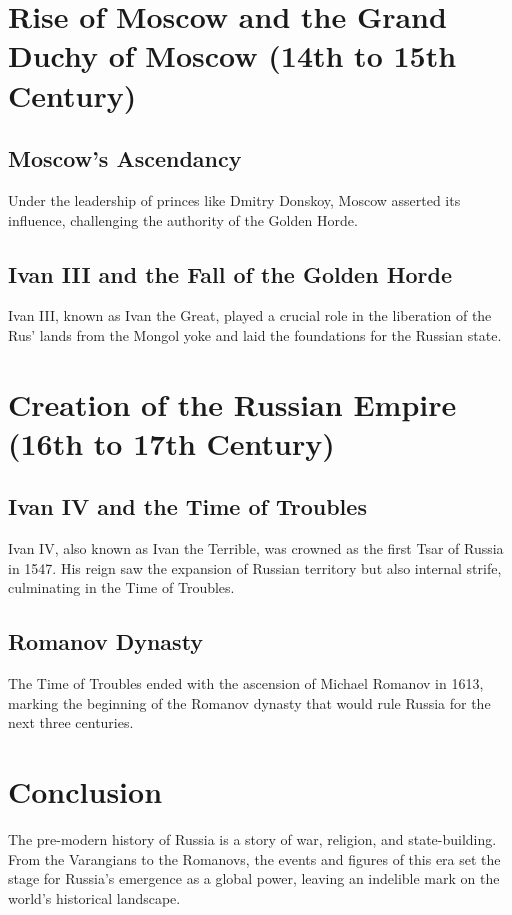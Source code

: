 \documentclass[a4paper,12pt]{book}
\begin{document}
\section{Rise of Moscow and the Grand Duchy of Moscow (14th to 15th Century)}
\label{sec:rise-of-moscow}
\subsection{Moscow’s Ascendancy}
Under the leadership of princes like Dmitry Donskoy, Moscow asserted its influence, challenging the authority of the Golden Horde.

\subsection{Ivan III and the Fall of the Golden Horde}
Ivan III, known as Ivan the Great, played a crucial role in the liberation of the Rus’ lands from the Mongol yoke and laid the foundations for the Russian state.

\section{Creation of the Russian Empire (16th to 17th Century)}
\label{sec:russian-empire}
\subsection{Ivan IV and the Time of Troubles}
Ivan IV, also known as Ivan the Terrible, was crowned as the first Tsar of Russia in 1547. His reign saw the expansion of Russian territory but also internal strife, culminating in the Time of Troubles.

\subsection{Romanov Dynasty}
The Time of Troubles ended with the ascension of Michael Romanov in 1613, marking the beginning of the Romanov dynasty that would rule Russia for the next three centuries.

\section{Conclusion}
\label{sec:conclusion-pre-modern-russia}
The pre-modern history of Russia is a story of war, religion, and state-building. From the Varangians to the Romanovs, the events and figures of this era set the stage for Russia's emergence as a global power, leaving an indelible mark on the world’s historical landscape.
\end{document}
